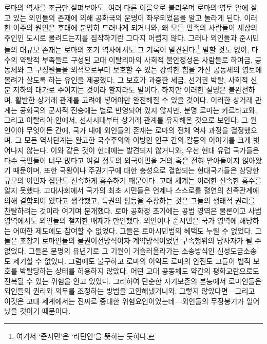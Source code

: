 로마의 역사를 조금만 살펴보아도,
여러 다른 이름으로 불리우며
로마의 영토 안에
살고 있는 외인들의 존재에 의해 공화국의 운명이
좌우되었음을 알고 놀라게 된다.
이러한 이주의 원인은 후대에 분명히 드러나게 되거니와,
왜 모든 민족의 사람들이 세상의 주인인 도시로 몰려드는지를
짐작하기란 그다지 어렵지 않다.
그러나 외인들과 준시민들의 대규모 존재는
로마의 초기 역사에서도 그 기록이 발견된다.\footnote{여기서 `준시민'은
`라틴인'을 뜻하는 듯하다.}
말할 것도 없이,
다수의 약탈적 부족들로 구성된 고대 이탈리아의 사회적 불안정성은
사람들로 하여금, 공동체와 그 구성원들을 외적으로부터 보호할 수 있는
강력한 힘을 가진 공동체의 영토에 몰려가 살도록 하는 유인을 제공했다.
그 보호가 과중한 세금, 선거권 박탈, 사회적 신분 저하의 대가로
주어지는 것이라 할지라도 말이다.
하지만 이러한 설명은 불완전하며,
활발한 상거래 관계를 고려에 넣어야만 완전해질 수 있을 것이다.
이러한 상거래 관계는 공화국의 군사적 전승에는
별로 반영되어 있지 않지만,
분명 로마는 카르타고와, 그리고 이탈리아 안에서,
선사시대부터 상거래 관계를 유지해온 것으로 보인다.
그 원인이야 무엇이든 간에,
국가 내에 외인들의 존재는
로마의 전체 역사 과정을 결정했으며,
그 모든 역사단계는 완고한 국수주의와 이방인 인구 간의 갈등의 이야기를
크게 벗어나지 않는다.
이와 같은 것이 현대에는 발견되지 않거니와,
우선 현대 유럽 국가들은 다수 국민들이 너무 많다고 여길 정도의
외국이민을 거의 혹은 전혀 받아들이지 않아왔기 때문이며,
또한
국왕이나 주권기구에 대한 충성으로 결합되는 현대국가들은
상당한 규모의 이민자 집단도
신속하게 흡수하기 때문이다.
고대 세계는 이러한 신속한 흡수를 알지 못했다.
고대사회에서 국가의 최초 시민들은 언제나 스스로를 혈연의 친족관계에 의해
결합되어 있다고 생각했고,
특권의 평등을 주장하는 것은 그들의 생래적 권리를 찬탈하려는 것이라
여기며 분개했다.
로마 공화정 초기에는
공법 영역은 물론이고 사법 영역에서도
외인들의 철저한 배제가 만연했다.
외인이나 준시민은
국가 영역에 해당하는 어떠한 제도에도 참여할 수 없었다.
그들은 로마시민법의 혜택도 누릴 수 없었다.
그들은 초창기 로마인들의 물권이전방식이자 계약방식이었던
구속행위의 당사자가 될 수 없었다.
그들은 문명의 유년기로 그 기원이 거슬러올라가는 소송방식인
신성도금소송도 제기할 수 없었다.
그럼에도 불구하고 로마의 이익도 로마의 안전도 그들이 법적 보호를 박탈당하는
상태를 허용하지 않았다.
어떤 고대 공동체도 약간의 평화교란으로도 전복될 수 있는 위험을 안고 있었다.
그리하여 단순한 자기보존의 본능에서 로마인들은
외인들의 권리와 의무를 조정하는 방법을 고안해냈거니와,
그렇지 않았다면---그리고 이것은 고대 세계에서는
진짜로 중대한 위험요인이었는데---외인들의 무장봉기가 일어났을 것이기 때문이다.
